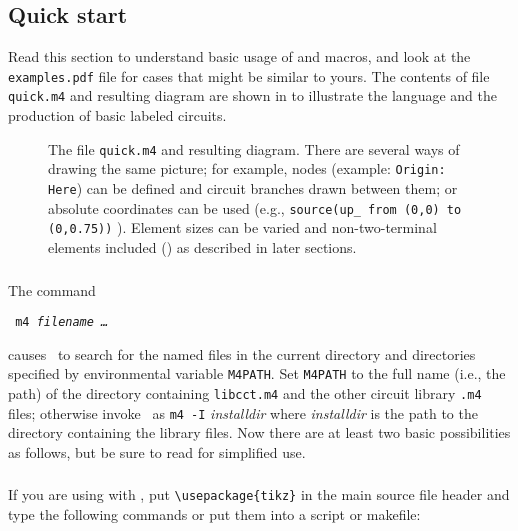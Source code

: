 \subsection{Quick start\label{Quickstart:}}
Read this section to understand basic usage of \Mfour and macros,
and look at the {\tt examples.pdf} file for cases
that might be similar to yours.
The contents of file {\tt quick.m4} and resulting diagram are shown
in  to illustrate the language and the production of basic
labeled circuits.
\begin{figure}[ht]
   \parbox{\textwidth}{\small}%
   \hfill\llap{\raise-1in\hbox{ }}%
   \caption{The file {\tt quick.m4} and resulting diagram.
     There are several ways of drawing the same picture; for example,
      nodes (example: {\tt Origin: Here}) can be defined and circuit branches
      drawn between them; or absolute coordinates can be used (e.g.,
      {\tt source(up\_ from (0,0) to (0,0.75))} ).  Element sizes
      can be varied and non-two-terminal elements included ()
      as described in later sections.\label{quick}}%
   \end{figure}

\subsubsection{%
\label{Usingmfour:}}
The command

  {\vspace*\parsep\tt
    m4 {\sl filename \ldots}
   \vspace*\parsep}

\noindent
causes \Mfour\ to search for the named
files in the current directory and directories specified
by environmental variable {\tt M4PATH}. 
Set {\tt M4PATH} to the full name (i.e., the path) of the directory containing
{\tt libcct.m4} and the other circuit library {\tt .m4} files; otherwise
invoke \Mfour\ as {\tt m4 -I} {\sl installdir} 
where {\sl installdir} is the path to the directory
containing the library files.
Now there are at least two basic possibilities as follows,
but be sure to read  for simplified use.

\subsubsection{%
\label{Processingwithpstricks:}}
If you are using \dpic  with \TPGF,
put \verb|\usepackage{tikz}| in the main \latex source file header and
type the following commands or put them into a script or makefile:

